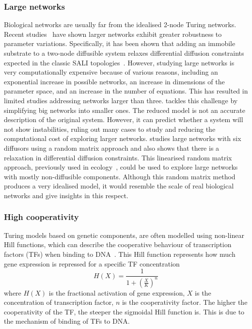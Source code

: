 \subsubsection{Large networks}
Biological networks are usually far from the idealised 2-node Turing networks. %
Recent studies~\parencite{Zheng2016, Scholes2019, Marcon} have shown larger networks exhibit greater robustness to parameter variations.
Specifically, it has been shown that adding an immobile substrate to a two-node diffusible system relaxes differential diffusion constraints expected in the classic SALI topologies~\parencite{korvasova2015}.
However, studying large networks is very computationally expensive because of various reasons, including an exponential increase in possible networks, an increase in dimensions of the parameter space, and an increase in the number of equations.
This has resulted in limited studies addressing networks larger than three.
\cite{Smith2018a} tackles this challenge by simplifying big networks into smaller ones.
The reduced model is not an accurate description of the original system.
However, it can predict whether a system will not show instabilities, ruling out many cases to study and reducing the computational cost of exploring larger networks.
\cite{Haas2021} studies large networks with six diffusors using a random matrix approach and also shows that there is a relaxation in differential diffusion constraints.
This linearised random matrix approach, previously used in ecology~\parencite{May1972}, could be used to explore large networks with mostly non-diffusible components.
Although this random matrix method produces a very idealised model, it would resemble the scale of real biological networks and give insights in this respect.


\subsubsection{High cooperativity}
Turing models based on genetic components, are often modelled using non-linear Hill functions, which can describe the cooperative behaviour of transcription factors (TFs) when binding to DNA~\parencite{Morgunova2017}.
This Hill function represents how much gene expression is repressed for a specific TF concentration
\begin{equation}
    H(X) = \frac{1}{1+(\frac{X}{K})^n}
\end{equation}
where $H(X)$ is the fractional activation of gene expression, $X$ is the concentration of transcription factor, $n$ is the cooperativity factor.
The higher the cooperativity of the TF, the steeper the sigmoidal Hill function is.
This is due to the mechanism of binding of TFs to DNA.

